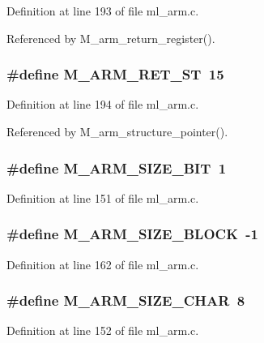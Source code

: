 Definition at line 193 of file ml\_\-arm.c.

Referenced by M\_\-arm\_\-return\_\-register().
\subsubsection{\setlength{\rightskip}{0pt plus 5cm}\#define M\_\-ARM\_\-RET\_\-ST~15}\label{ml__arm_8c_5dfcb16ae3cb5f709a99ecb3b48e9733}




Definition at line 194 of file ml\_\-arm.c.

Referenced by M\_\-arm\_\-structure\_\-pointer().
\subsubsection{\setlength{\rightskip}{0pt plus 5cm}\#define M\_\-ARM\_\-SIZE\_\-BIT~1}\label{ml__arm_8c_f6b3e0b04abc8086bb9185e4c265e35c}




Definition at line 151 of file ml\_\-arm.c.
\subsubsection{\setlength{\rightskip}{0pt plus 5cm}\#define M\_\-ARM\_\-SIZE\_\-BLOCK~-1}\label{ml__arm_8c_ff72691295353470fa386a37a660ea08}




Definition at line 162 of file ml\_\-arm.c.
\subsubsection{\setlength{\rightskip}{0pt plus 5cm}\#define M\_\-ARM\_\-SIZE\_\-CHAR~8}\label{ml__arm_8c_4f09e0e331c1bdafc1104c846ecceae6}




Definition at line 152 of file ml\_\-arm.c.
